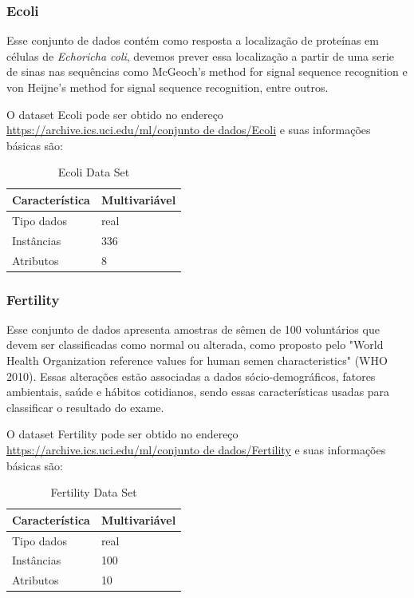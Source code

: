 \documentclass[12pt, a4paper]{article}
\begin{document}
\subsubsection{Ecoli}
Esse  conjunto de dados contém como resposta a localização de proteínas em células de \emph{Echoricha coli}, devemos prever essa localização a partir de uma serie de sinas nas sequências como McGeoch's method for signal sequence recognition e von Heijne's method for signal sequence recognition, entre outros.

O dataset Ecoli pode ser obtido no endereço \url{https://archive.ics.uci.edu/ml/conjunto de dados/Ecoli} e suas informações básicas são:
\begin{table}[!ht]
\centering
\caption{Ecoli Data Set}
\label{ecolitable}
\begin{tabular}{|l|l|}
\hline
Característica & Multivariável\\
\hline
Tipo dados & real\\
\hline
Instâncias & 336\\
\hline
Atributos & 8 \\
\hline
\end{tabular}
\end{table}

\subsubsection{Fertility}

Esse conjunto de dados apresenta amostras de sêmen de 100 voluntários que devem ser classificadas como normal ou alterada, como proposto pelo "World Health Organization reference values for human semen characteristics" (WHO 2010). Essas alterações estão associadas a dados sócio-demográficos, fatores ambientais, saúde e hábitos cotidianos, sendo essas características usadas para classificar o resultado do exame.	

O dataset Fertility pode ser obtido no endereço \url{https://archive.ics.uci.edu/ml/conjunto de dados/Fertility} e suas informações básicas são:
\begin{table}[!ht]
\centering
\caption{Fertility Data Set}
\label{fertilitytable}
\begin{tabular}{|l|l|}
\hline
Característica & Multivariável\\
\hline
Tipo dados & real\\
\hline
Instâncias & 100\\
\hline
Atributos & 10 \\
\hline
\end{tabular}
\end{table}
\end{document}
